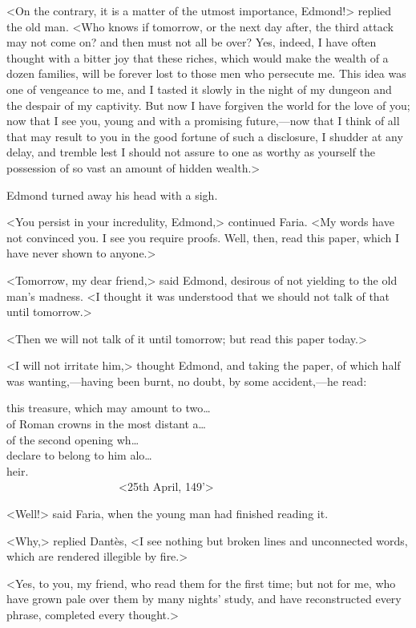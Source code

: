  <On the contrary, it is a matter of the utmost importance, Edmond!> replied the old man. <Who knows if tomorrow, or the next day after, the third attack may not come on? and then must not all be over? Yes, indeed, I have often thought with a bitter joy that these riches, which would make the wealth of a dozen families, will be forever lost to those men who persecute me. This idea was one of vengeance to me, and I tasted it slowly in the night of my dungeon and the despair of my captivity. But now I have forgiven the world for the love of you; now that I see you, young and with a promising future,—now that I think of all that may result to you in the good fortune of such a disclosure, I shudder at any delay, and tremble lest I should not assure to one as worthy as yourself the possession of so vast an amount of hidden wealth.> 

 Edmond turned away his head with a sigh. 

 <You persist in your incredulity, Edmond,> continued Faria. <My words have not convinced you. I see you require proofs. Well, then, read this paper, which I have never shown to anyone.> 

 <Tomorrow, my dear friend,> said Edmond, desirous of not yielding to the old man's madness. <I thought it was understood that we should not talk of that until tomorrow.> 

 <Then we will not talk of it until tomorrow; but read this paper today.> 

 <I will not irritate him,> thought Edmond, and taking the paper, of which half was wanting,—having been burnt, no doubt, by some accident,—he read:  
 
 \begin{blockquote}\oldfont
 this treasure, which may amount to two\dots \\ of Roman crowns in the most distant a\dots \\ of the second opening wh\dots \\ declare to belong to him alo\dots \\ heir.\\                     <25th April, 149'> 
 \end{blockquote}

 <Well!> said Faria, when the young man had finished reading it. 

 <Why,> replied Dantès, <I see nothing but broken lines and unconnected words, which are rendered illegible by fire.> 

 <Yes, to you, my friend, who read them for the first time; but not for me, who have grown pale over them by many nights' study, and have reconstructed every phrase, completed every thought.> 

